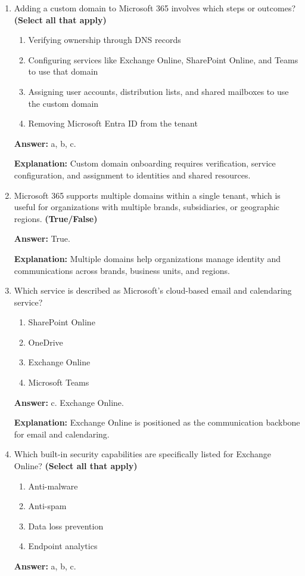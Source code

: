 \documentclass[10pt]{article}
\begin{document}
\begin{enumerate}[leftmargin=*]
\textbf{Explanation:} These examples show Microsoft-provided default tenant domains before a custom domain is added.

\item Adding a custom domain to Microsoft 365 involves which steps or outcomes? \textbf{(Select all that apply)}
\begin{enumerate}[label=\alph*., leftmargin=1.5em]
\item Verifying ownership through DNS records
\item Configuring services like Exchange Online, SharePoint Online, and Teams to use that domain
\item Assigning user accounts, distribution lists, and shared mailboxes to use the custom domain
\item Removing Microsoft Entra ID from the tenant
\end{enumerate}
\textbf{Answer:} a, b, c.

\textbf{Explanation:} Custom domain onboarding requires verification, service configuration, and assignment to identities and shared resources.

\item Microsoft 365 supports multiple domains within a single tenant, which is useful for organizations with multiple brands, subsidiaries, or geographic regions. \textbf{(True/False)}

\textbf{Answer:} True.

\textbf{Explanation:} Multiple domains help organizations manage identity and communications across brands, business units, and regions.

\item Which service is described as Microsoft’s cloud-based email and calendaring service?
\begin{enumerate}[label=\alph*., leftmargin=1.5em]
\item SharePoint Online
\item OneDrive
\item Exchange Online
\item Microsoft Teams
\end{enumerate}
\textbf{Answer:} c. Exchange Online.

\textbf{Explanation:} Exchange Online is positioned as the communication backbone for email and calendaring.

\item Which built-in security capabilities are specifically listed for Exchange Online? \textbf{(Select all that apply)}
\begin{enumerate}[label=\alph*., leftmargin=1.5em]
\item Anti-malware
\item Anti-spam
\item Data loss prevention
\item Endpoint analytics
\end{enumerate}
\textbf{Answer:} a, b, c.


\end{enumerate}
\end{document}
